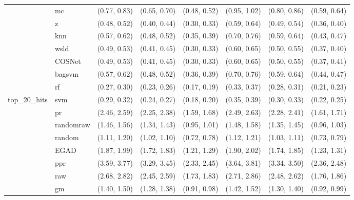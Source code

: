 \begin{table}[H]
{\begin{tabular}{llllllll}
 & mc & (0.77, 0.83) & (0.65, 0.70) & (0.48, 0.52) & (0.95, 1.02) & (0.80, 0.86) & (0.59, 0.64)\\

 & z & (0.48, 0.52) & (0.40, 0.44) & (0.30, 0.33) & (0.59, 0.64) & (0.49, 0.54) & (0.36, 0.40)\\

 & knn & (0.57, 0.62) & (0.48, 0.52) & (0.35, 0.39) & (0.70, 0.76) & (0.59, 0.64) & (0.43, 0.47)\\

 & wsld & (0.49, 0.53) & (0.41, 0.45) & (0.30, 0.33) & (0.60, 0.65) & (0.50, 0.55) & (0.37, 0.40)\\

 & COSNet & (0.49, 0.53) & (0.41, 0.45) & (0.30, 0.33) & (0.60, 0.65) & (0.50, 0.55) & (0.37, 0.41)\\

 & bagsvm & (0.57, 0.62) & (0.48, 0.52) & (0.36, 0.39) & (0.70, 0.76) & (0.59, 0.64) & (0.44, 0.47)\\

 & rf & (0.27, 0.30) & (0.23, 0.26) & (0.17, 0.19) & (0.33, 0.37) & (0.28, 0.31) & (0.21, 0.23)\\

\multirow{-15}{*}{\raggedright\arraybackslash top\_20\_hits} & svm & (0.29, 0.32) & (0.24, 0.27) & (0.18, 0.20) & (0.35, 0.39) & (0.30, 0.33) & (0.22, 0.25)\\
\cmidrule{1-8}
 & pr & (2.46, 2.59) & (2.25, 2.38) & (1.59, 1.68) & (2.49, 2.63) & (2.28, 2.41) & (1.61, 1.71)\\

 & randomraw & (1.46, 1.56) & (1.34, 1.43) & (0.95, 1.01) & (1.48, 1.58) & (1.35, 1.45) & (0.96, 1.03)\\

 & random & (1.11, 1.20) & (1.02, 1.10) & (0.72, 0.78) & (1.12, 1.21) & (1.03, 1.11) & (0.73, 0.79)\\

 & EGAD & (1.87, 1.99) & (1.72, 1.83) & (1.21, 1.29) & (1.90, 2.02) & (1.74, 1.85) & (1.23, 1.31)\\

 & ppr & (3.59, 3.77) & (3.29, 3.45) & (2.33, 2.45) & (3.64, 3.81) & (3.34, 3.50) & (2.36, 2.48)\\

 & raw & (2.68, 2.82) & (2.45, 2.59) & (1.73, 1.83) & (2.71, 2.86) & (2.48, 2.62) & (1.76, 1.86)\\

 & gm & (1.40, 1.50) & (1.28, 1.38) & (0.91, 0.98) & (1.42, 1.52) & (1.30, 1.40) & (0.92, 0.99)\\


\end{tabular}}
\end{table}
